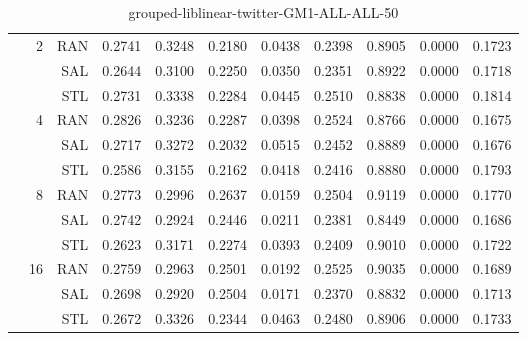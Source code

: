 \begin{center}
\begin{table}[htbp]
\begin{center}
\begin{tabular}{ | r | r | r | r | r | r | r | r | r | r | r |}
 & \multirow{3}{*}{2} & RAN & 0.2741 & 0.3248 & 0.2180 & 0.0438 & 0.2398 & 0.8905 & 0.0000 & 0.1723\\ \cline{3-11}
 &   & SAL & 0.2644 & 0.3100 & 0.2250 & 0.0350 & 0.2351 & 0.8922 & 0.0000 & 0.1718\\ \cline{3-11}
 &   & STL & 0.2731 & 0.3338 & 0.2284 & 0.0445 & 0.2510 & 0.8838 & 0.0000 & 0.1814\\ \cline{2-11}
 & \multirow{3}{*}{4} & RAN & 0.2826 & 0.3236 & 0.2287 & 0.0398 & 0.2524 & 0.8766 & 0.0000 & 0.1675\\ \cline{3-11}
 &   & SAL & 0.2717 & 0.3272 & 0.2032 & 0.0515 & 0.2452 & 0.8889 & 0.0000 & 0.1676\\ \cline{3-11}
 &   & STL & 0.2586 & 0.3155 & 0.2162 & 0.0418 & 0.2416 & 0.8880 & 0.0000 & 0.1793\\ \cline{2-11}
 & \multirow{3}{*}{8} & RAN & 0.2773 & 0.2996 & 0.2637 & 0.0159 & 0.2504 & 0.9119 & 0.0000 & 0.1770\\ \cline{3-11}
 &   & SAL & 0.2742 & 0.2924 & 0.2446 & 0.0211 & 0.2381 & 0.8449 & 0.0000 & 0.1686\\ \cline{3-11}
 &   & STL & 0.2623 & 0.3171 & 0.2274 & 0.0393 & 0.2409 & 0.9010 & 0.0000 & 0.1722\\ \cline{2-11}
 & \multirow{3}{*}{16} & RAN & 0.2759 & 0.2963 & 0.2501 & 0.0192 & 0.2525 & 0.9035 & 0.0000 & 0.1689\\ \cline{3-11}
 &   & SAL & 0.2698 & 0.2920 & 0.2504 & 0.0171 & 0.2370 & 0.8832 & 0.0000 & 0.1713\\ \cline{3-11}
 &   & STL & 0.2672 & 0.3326 & 0.2344 & 0.0463 & 0.2480 & 0.8906 & 0.0000 & 0.1733\\ \cline{2-11}
\hline
\end{tabular}
\caption{grouped-liblinear-twitter-GM1-ALL-ALL-50}
\end{center}
 \end{table}
\end{center}

